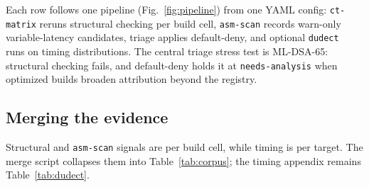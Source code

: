 Each row follows one pipeline (Fig.~\ref{fig:pipeline}) from one YAML config:
\texttt{ct-matrix} reruns structural checking per build cell, \texttt{asm-scan}
records warn-only variable-latency candidates, triage applies default-deny, and
optional \texttt{dudect}~\cite{dudect} runs on timing distributions. The central
triage stress test is ML-DSA-65: structural checking fails, and default-deny
holds it at \texttt{needs-analysis} when optimized builds broaden attribution
beyond the registry.

\subsection{Merging the evidence}

Structural and \texttt{asm-scan} signals are per build cell, while timing is per
target. The merge script collapses them into Table~\ref{tab:corpus}; the timing
appendix remains Table~\ref{tab:dudect}.
